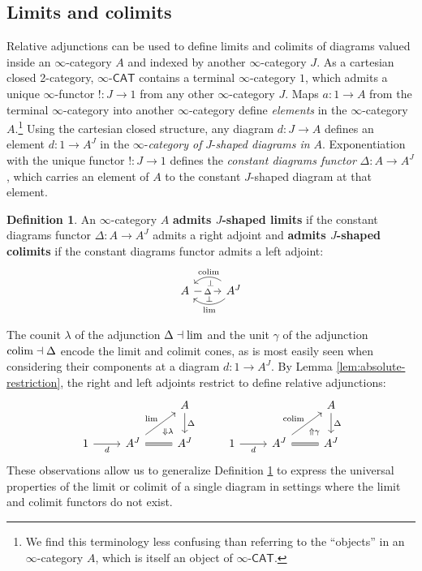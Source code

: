 \documentclass[11pt]{ctexart}
\theoremstyle{definition}
\newtheorem{defn}[thm]{Definition}
\theoremstyle{remark}
\numberwithin{equation}{section}
\renewcommand{\lim}{\textup{lim}}
\newcommand{\colim}{\textup{colim}}
\newcommand{\ooCAT}{\infty\text{-}\mathsf{CAT}}
\newcommand{\1}{\mathbbe{1}}
\newcommand{\2}{\mathbbe{2}}
\newcommand{\3}{\mathbbe{3}}
\begin{document}
\subsection*{Limits and colimits}

Relative adjunctions can be used to define limits and colimits of diagrams valued inside an $\infty$-category $A$ and indexed by another $\infty$-category $J$. As a cartesian closed 2-category,  $\ooCAT$ contains a terminal $\infty$-category $1$, which admits a unique $\infty$-functor $! \colon J \to 1$ from any other $\infty$-category $J$. Maps $a \colon 1 \to A$ from the terminal $\infty$-category into another $\infty$-category define \emph{elements} in the $\infty$-category $A$.\footnote{We find this terminology less confusing than referring to the ``objects'' in an $\infty$-category $A$, which is itself an object of $\ooCAT$.} Using the cartesian closed structure, any diagram $d \colon J \to A$ defines an element $d \colon 1 \to A^J$ in the $\infty$-\emph{category of} $J$-\emph{shaped diagrams in} $A$. Exponentiation with the unique functor $! \colon J \to 1$ defines the \emph{constant diagrams functor} $\Delta \colon A \to A^J$, which carries an element of $A$ to the constant $J$-shaped diagram at that element.

\begin{defn}\label{defn:limit-colimit} An $\infty$-category $A$ \textbf{admits $J$-shaped limits} if the constant diagrams functor $\Delta \colon A \to A^J$ admits a right adjoint and \textbf{admits $J$-shaped colimits} if the constant diagrams functor admits a left adjoint:
    \[
        \begin{tikzcd} A \arrow[r, "\Delta" description] & A^J \arrow[l, bend left=40, "\lim", "\bot"'] \arrow[l, bend right=40, "\colim"' pos=.45, "\bot" pos=.6]
        \end{tikzcd}
    \]
\end{defn}

The counit $\lambda$ of the adjunction $\Delta\dashv\lim$ and the unit $\gamma$ of the adjunction $\colim\dashv\Delta$ encode the limit and colimit cones, as is most easily seen when considering their components at a diagram $d \colon 1 \to A^J$. By Lemma \ref{lem:absolute-restriction}, the right and left adjoints restrict to define relative adjunctions:
\[
    \begin{tikzcd}
        & \arrow[dr, phantom, "\scriptstyle\Downarrow\lambda" very near end] & A \arrow[d, "\Delta"] & & \arrow[dr, phantom, "\scriptstyle\Uparrow\gamma" very near end] & A \arrow[d, "\Delta"] \\ 1 \arrow[r, "d"'] & A^J \arrow[ur, "\lim"] \arrow[r, equals] & A^J & 1 \arrow[r, "d"'] & A^J \arrow[ur, "\colim"] \arrow[r, equals] & A^J
    \end{tikzcd}
\]
These observations allow us to generalize Definition \ref{defn:limit-colimit} to express the universal properties of the limit or colimit of a single diagram in settings where the limit and colimit functors do not exist.
\end{document}

